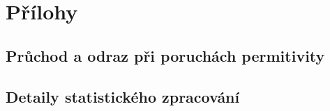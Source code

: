 \chapter{Přílohy}
  \section{Průchod a odraz při poruchách permitivity}
  
  \section{Detaily statistického zpracování}
